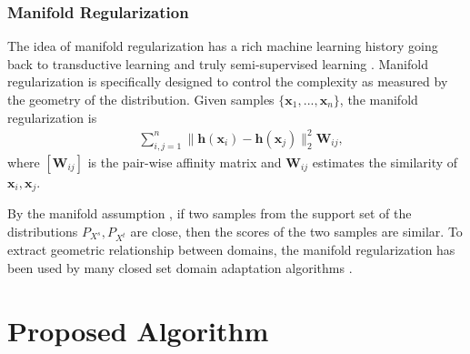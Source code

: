 \documentclass[journal]{IEEEtran}
\begin{document}
\subsubsection{Manifold Regularization}
{The idea of manifold regularization has a rich machine learning history going back to transductive learning and truly semi-supervised learning} \cite{DBLP:journals/jmlr/BelkinNS06}. {Manifold regularization is specifically designed to control the
complexity as measured by the geometry of the distribution. Given samples $\{\mathbf{x}_1,...,\mathbf{x}_n\}$, the manifold regularization is}
\begin{equation*}
\begin{split}
    &\sum^{n}_{i,j=1}\|{\bm h}(\mathbf{x}_i)-{\bm h}(\mathbf{x}_{j})\|_2^2\mathbf{W}_{ij},
    \end{split}
\end{equation*}
{where $[\mathbf{W}_{ij}]$ is the pair-wise affinity matrix and $\mathbf{W}_{ij}$ estimates the similarity of $\mathbf{x}_i,\mathbf{x}_j$.}

{By  the  manifold  assumption} \cite{DBLP:journals/jmlr/BelkinNS06}, {if two samples from the support set of the distributions $P_{X^s},P_{X^t}$ are  close, then  the  scores  of  the  two samples are similar. To extract geometric relationship between domains, the manifold regularization has been used by many closed set domain adaptation algorithms} \cite{ DBLP:conf/cikm/QuanzH09,DBLP:journals/tkde/LongWDPY14,DBLP:conf/mm/WangFCYHY18,DBLP:journals/tkde/Long0DS014,DBLP:journals/kbs/ZhangLO19,DBLP:journals/pami/LiZ19,DBLP:conf/ijcai/WangM11}.

\section{Proposed Algorithm}
\end{document}
